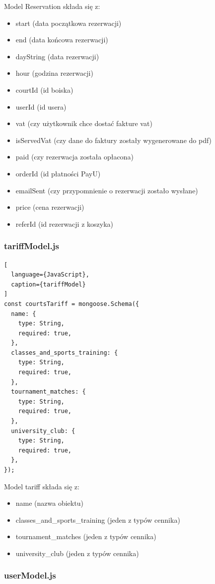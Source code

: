 \documentclass[titlepage]{article}
\begin{document}
Model Reservation składa się z:
\begin{itemize}
  \item start (data początkowa rezerwacji)
  \item end (data końcowa rezerwacji)
  \item dayString (data rezerwacji)
  \item hour (godzina rezerwacji)
  \item courtId (id boiska)
  \item userId (id usera)
  \item vat (czy użytkownik chce dostać fakture vat)
  \item isServedVat (czy dane do faktury zostały wygenerowane do pdf)
  \item paid (czy rezerwacja została opłacona)
  \item orderId (id płatności PayU)
  \item emailSent (czy przypomnienie o rezerwacji zostało wysłane)
  \item price (cena rezerwacji)
  \item referId (id rezerwacji z koszyka)
\end{itemize}

\subsubsection{tariffModel.js}

\begin{lstlisting}[
  language={JavaScript},
  caption={tariffModel}
]
const courtsTariff = mongoose.Schema({
  name: {
    type: String,
    required: true,
  },
  classes_and_sports_training: {
    type: String,
    required: true,
  },
  tournament_matches: {
    type: String,
    required: true,
  },
  university_club: {
    type: String,
    required: true,
  },
});

\end{lstlisting}

Model tariff składa się z:
\begin{itemize}
  \item name (nazwa obiektu)
  \item classes\_and\_sports\_training (jeden z typów cennika)
  \item tournament\_matches (jeden z typów cennika)
  \item university\_club (jeden z typów cennika)
\end{itemize}


\subsubsection{userModel.js}
\end{document}
